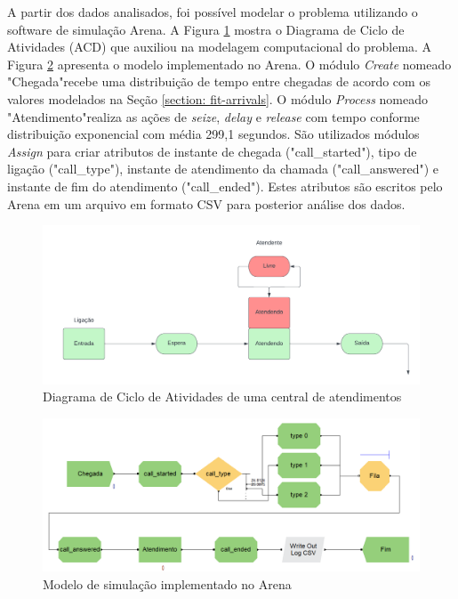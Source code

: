 A partir dos dados analisados, foi possível modelar o problema utilizando o software de simulação Arena. A Figura \ref*{fig: ACD} mostra o Diagrama de Ciclo de Atividades (ACD) que auxiliou na modelagem computacional do problema. A Figura \ref*{fig: modelo-arena} apresenta o modelo implementado no Arena. O módulo \textit{Create} nomeado "Chegada"\;recebe uma distribuição de tempo entre chegadas de acordo com os valores modelados na Seção \ref*{section: fit-arrivals}. O módulo \textit{Process} nomeado "Atendimento"\;realiza as ações de \textit{seize}, \textit{delay} e \textit{release} com tempo conforme distribuição exponencial com média 299,1 segundos. São utilizados módulos \textit{Assign} para criar atributos de instante de chegada ("call\_started"), tipo de ligação ("call\_type"), instante de atendimento da chamada ("call\_answered") e instante de fim do atendimento ("call\_ended"). Estes atributos são escritos pelo Arena em um arquivo em formato CSV para posterior análise dos dados.

\begin{figure}[H]
    \includegraphics[scale=0.3]{simulacao/acd_vcbc.png}
    \caption{Diagrama de Ciclo de Atividades de uma central de atendimentos}
    \label{fig: ACD}
\end{figure}

\begin{figure}[H]
    \includegraphics[scale=0.6]{simulacao/modelo-arena.png}
    \caption{Modelo de simulação implementado no Arena}
    \label{fig: modelo-arena}
\end{figure}

